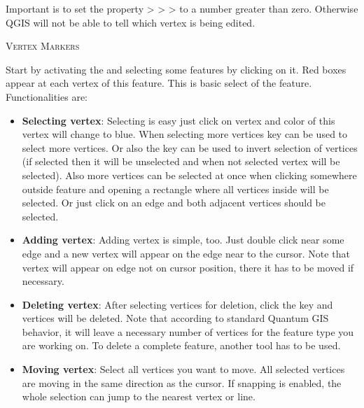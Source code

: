 Important is to set the property  >
 >
> to a number greater than
zero. Otherwise QGIS will not be able to tell which vertex is being edited.

\begin{Tip}[ht]\caption{\textsc{Vertex Markers}}
\end{Tip}


Start by activating the  and selecting
some features by clicking on it. Red boxes appear at each vertex of this feature.
This is basic select of the feature. Functionalities are:

\begin{itemize}
\item \textbf{Selecting vertex}: Selecting is easy just click on vertex and
color of this vertex will change to blue. When selecting more vertices
 key can be used to select more vertices. Or also the
 key can be used to invert selection of vertices (if selected then
it will be unselected and when not selected vertex will be selected). Also more
vertices can be selected at once when clicking somewhere outside feature and opening a rectangle where all vertices inside will be selected. Or just click on an edge and
both adjacent vertices should be selected.
\item \textbf{Adding vertex}: Adding vertex is simple, too. Just double click near
some edge and a new vertex will appear on the edge near to the cursor. Note that
vertex will appear on edge not on cursor position, there it has to be moved if
necessary.
\item \textbf{Deleting vertex}: After selecting vertices for deletion, click the
 key and vertices will be deleted. Note that according to
standard Quantum GIS behavior, it will leave a necessary number of vertices for
the feature type you are working on. To delete a complete feature, another tool
has to be used.
\item \textbf{Moving vertex}: Select all vertices you want to move. All selected
vertices are moving in the same direction as the cursor. If snapping is enabled,
the whole selection can jump to the nearest vertex or line.
\end{itemize}

